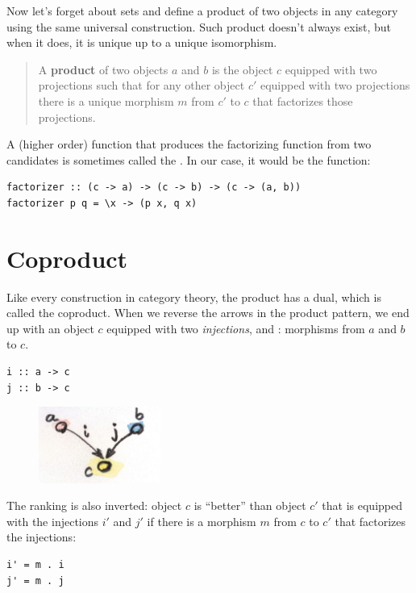 Now let's forget about sets and define a product of two objects in any
category using the same universal construction. Such product doesn't
always exist, but when it does, it is unique up to a unique isomorphism.

\begin{quote}
A \textbf{product} of two objects $a$ and $b$ is the object
$c$ equipped with two projections such that for any other object
$c'$ equipped with two projections there is a unique morphism
$m$ from $c'$ to $c$ that factorizes those projections.
\end{quote}

\noindent
A (higher order) function that produces the factorizing function
 from two candidates is sometimes called the
. In our case, it would be the function:

\begin{Verbatim}
factorizer :: (c -> a) -> (c -> b) -> (c -> (a, b))
factorizer p q = \x -> (p x, q x)
\end{Verbatim}

\section{Coproduct}

Like every construction in category theory, the product has a dual,
which is called the coproduct. When we reverse the arrows in the product
pattern, we end up with an object $c$ equipped with two
\emph{injections},  and : morphisms from $a$
and $b$ to $c$.

\begin{Verbatim}
i :: a -> c
j :: b -> c
\end{Verbatim}

\begin{figure}[H]
\centering
\includegraphics[width=40mm]{images/coproductpattern.jpg}
\end{figure}

\noindent
The ranking is also inverted: object $c$ is ``better'' than object
$c'$ that is equipped with the injections $i'$ and $j'$
if there is a morphism $m$ from $c$ to $c'$ that
factorizes the injections:

\begin{Verbatim}
i' = m . i
j' = m . j
\end{Verbatim}

